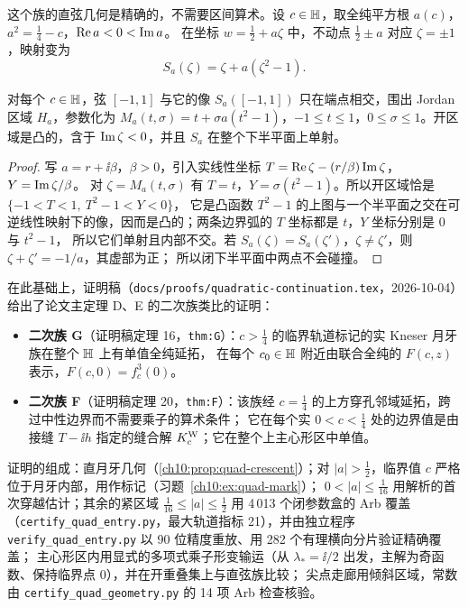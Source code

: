 这个族的直弦几何是精确的，不需要区间算术。设 $c\in\mathbb{H}$，取全纯平方根 $a(c)$，$a^2=\tfrac14-c$，$\operatorname{Re} a<0<\operatorname{Im} a$。
在坐标 $w=\tfrac12+a\zeta$ 中，不动点 $\tfrac12\pm a$ 对应 $\zeta=\pm1$，映射变为
\[
  S_a(\zeta)=\zeta+a(\zeta^2-1).
\]

\begin{proposition}\label{ch10:prop:quad-crescent}
对每个 $c\in\mathbb{H}$，弦 $[-1,1]$ 与它的像 $S_a([-1,1])$ 只在端点相交，围出 Jordan 区域 $H_a$，参数化为
$M_a(t,\sigma)=t+\sigma a(t^2-1)$，$-1\le t\le1$，$0\le\sigma\le1$。开区域是凸的，含于 $\operatorname{Im}\zeta<0$，并且 $S_a$ 在整个下半平面上单射。
\end{proposition}

\begin{proof}
写 $a=r+\ii\beta$，$\beta>0$，引入实线性坐标 $T=\operatorname{Re}\zeta-(r/\beta)\operatorname{Im}\zeta$，$Y=\operatorname{Im}\zeta/\beta$。
对 $\zeta=M_a(t,\sigma)$ 有 $T=t$，$Y=\sigma(t^2-1)$。所以开区域恰是 $\{-1<T<1,\ T^2-1<Y<0\}$，
它是凸函数 $T^2-1$ 的上图与一个半平面之交在可逆线性映射下的像，因而是凸的；两条边界弧的 $T$ 坐标都是 $t$，$Y$ 坐标分别是 $0$ 与 $t^2-1$，
所以它们单射且内部不交。若 $S_a(\zeta)=S_a(\zeta')$，$\zeta\neq\zeta'$，则 $\zeta+\zeta'=-1/a$，其虚部为正；
所以闭下半平面中两点不会碰撞。
\end{proof}

在此基础上，证明稿（\texttt{docs/proofs/quadratic-continuation.tex}，2026-10-04）给出了论文主定理 D、E 的二次族类比的证明：
\begin{itemize}
\item \textbf{二次族 G}（证明稿定理 16，\texttt{thm:G}）：$c>\tfrac14$ 的临界轨道标记的实 Kneser 月牙族在整个 $\mathbb{H}$ 上有单值全纯延拓，
  在每个 $c_0\in\mathbb{H}$ 附近由联合全纯的 $F(c,z)$ 表示，$F(c,0)=f_c^3(0)$。
\item \textbf{二次族 F}（证明稿定理 20，\texttt{thm:F}）：该族经 $c=\tfrac14$ 的上方穿孔邻域延拓，跨过中性边界而不需要乘子的算术条件；
  它在每个实 $0<c<\tfrac14$ 处的边界值是由接缝 $T-\ii h$ 指定的缝合解 $K^{\mathrm W}_c$；它在整个上主心形区中单值。
\end{itemize}
证明的组成：直月牙几何（\cref{ch10:prop:quad-crescent}）；对 $|a|>\tfrac12$，临界值 $c$ 严格位于月牙内部，用作标记（习题~\ref{ch10:ex:quad-mark}）；
$0<|a|\le\tfrac1{16}$ 用解析的首次穿越估计；其余的紧区域 $\tfrac1{16}\le|a|\le\tfrac12$ 用 4\,013 个闭参数盒的 Arb 覆盖
（\texttt{certify\_quad\_entry.py}，最大轨道指标 21），并由独立程序 \texttt{verify\_quad\_entry.py} 以 90 位精度重放、用 282 个有理横向分片验证精确覆盖；
主心形区内用显式的多项式乘子形变输运（从 $\lambda_*=\ii/2$ 出发，主解为奇函数、保持临界点 $0$），并在开重叠集上与直弦族比较；
尖点走廊用倾斜区域，常数由 \texttt{certify\_quad\_geometry.py} 的 14 项 Arb 检查核验。

